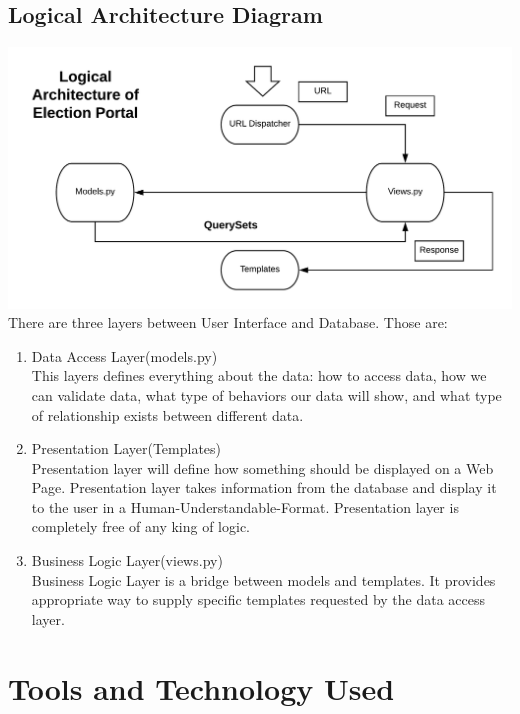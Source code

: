 \documentclass[12pt, a4paper, titlepage]{article}
\begin{document}
\subsection{Logical Architecture Diagram}
\includegraphics[scale=0.8]{Logical_Architecture.png}\\
There are three layers between User Interface and Database. Those are:
\begin{enumerate}
\item Data Access Layer(models.py)\\
This layers defines everything about the data: how to access data, how we can validate data, what type of behaviors our data will show, and what type of relationship exists between different data.
\item Presentation Layer(Templates)\\
Presentation layer will define how something should be displayed on a Web Page. Presentation layer takes information from the database and display it to the user in a Human-Understandable-Format. Presentation layer is completely free of any king of logic.
\item Business Logic Layer(views.py)\\
Business Logic Layer is a bridge between models and templates. It provides appropriate way to supply specific templates requested by the data access layer.
\end{enumerate}
\newpage

\section{Tools and Technology Used}
\end{document}
